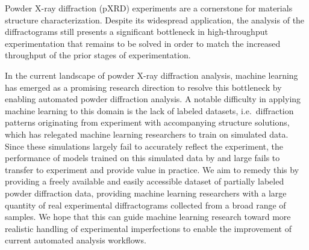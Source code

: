 Powder X-ray diffraction (pXRD) experiments are a cornerstone for materials structure characterization.
Despite its widespread application, the analysis of the diffractograms still presents a significant bottleneck
in high-throughput experimentation that remains to be solved in order to match the increased throughput
of the prior stages of experimentation. 

In the current landscape of powder X-ray diffraction analysis, machine learning has emerged as a promising research direction to resolve this bottleneck by enabling automated powder diffraction analysis.
A notable difficulty in applying machine learning to this domain is the lack of labeled datasets, i.e.\
diffraction patterns originating from experiment with accompanying structure solutions, which has relegated machine learning
researchers to train on simulated data.
Since these simulations largely fail to accurately reflect the experiment, the performance of models trained
on this simulated data by and large fails to transfer to experiment and provide value in practice.
We aim to remedy this by providing a freely available and easily accessible dataset of partially labeled
powder diffraction data, providing machine learning researchers with a large quantity of real experimental diffractograms collected from a broad range of samples.
We hope that this can guide machine learning research toward more realistic handling of experimental imperfections to enable the improvement of current automated analysis workflows.